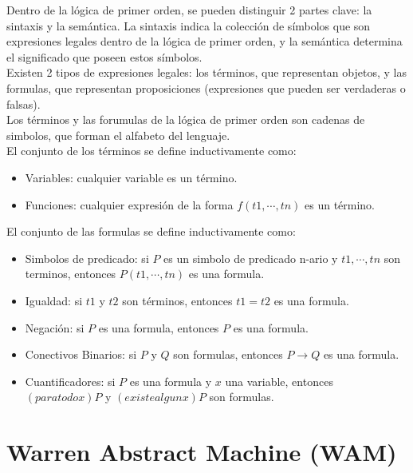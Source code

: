 \documentclass[12pt,titlepage]{article}
\begin{document}
Dentro de la lógica de primer orden, se pueden distinguir 2 partes clave: la sintaxis y la semántica. La sintaxis indica la colección de símbolos que son expresiones legales dentro de la lógica de primer orden, y la semántica determina el significado que poseen estos símbolos. \\

Existen 2 tipos de expresiones legales: los términos, que representan objetos, y las formulas, que representan proposiciones (expresiones que pueden ser verdaderas o falsas). \\

Los términos y las forumulas de la lógica de primer orden son cadenas de simbolos, que forman el alfabeto del lenguaje. \\

El conjunto de los términos se define inductivamente como: \\
\begin{itemize}
    \item Variables: cualquier variable es un término.
    \item Funciones: cualquier expresión de la forma $f(t1,\cdots,tn)$ es un término.
\end{itemize}
El conjunto de las formulas se define inductivamente como: \\
\begin{itemize}
    \item Simbolos de predicado: si $P$ es un simbolo de predicado n-ario y $t1,\cdots,tn$ son terminos, entonces $P(t1,\cdots,tn)$ es una formula.
    \item Igualdad: si $t1$ y $t2$ son términos, entonces $t1=t2$ es una formula.
    \item Negación: si $P$ es una formula, entonces $P$ es una formula. %
    \item Conectivos Binarios: si $P$ y $Q$ son formulas, entonces $P \rightarrow Q$ es una formula. %
    \item Cuantificadores: si $P$ es una formula y $x$ una variable, entonces $(para todo x)P$ y $(existe algun x)P$ son formulas. %
\end{itemize}

\newpage

\section{Warren Abstract Machine (WAM)}
\end{document}
